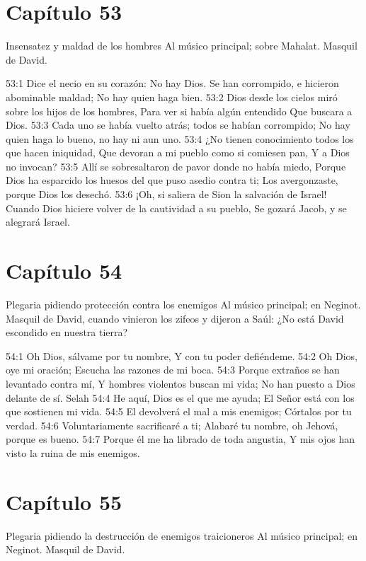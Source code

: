 \section*{Capítulo 53}
Insensatez y maldad de los hombres 
Al músico principal; sobre Mahalat. Masquil de David. 
 
53:1 Dice el necio en su corazón: No hay Dios. 
Se han corrompido, e hicieron abominable maldad; 
No hay quien haga bien. 
53:2 Dios desde los cielos miró sobre los hijos de los hombres, 
Para ver si había algún entendido 
Que buscara a Dios. 
53:3 Cada uno se había vuelto atrás; todos se habían corrompido; 
No hay quien haga lo bueno, no hay ni aun uno. 
53:4 ¿No tienen conocimiento todos los que hacen iniquidad, 
Que devoran a mi pueblo como si comiesen pan, 
Y a Dios no invocan? 
53:5 Allí se sobresaltaron de pavor donde no había miedo, 
Porque Dios ha esparcido los huesos del que puso asedio contra ti; 
Los avergonzaste, porque Dios los desechó. 
53:6 ¡Oh, si saliera de Sion la salvación de Israel! 
Cuando Dios hiciere volver de la cautividad a su pueblo, 
Se gozará Jacob, y se alegrará Israel. 
\section*{Capítulo 54}
Plegaria pidiendo protección contra los enemigos 
Al músico principal; en Neginot. Masquil de David, cuando vinieron los zifeos y dijeron a Saúl: ¿No está David escondido en nuestra tierra? 
 
54:1 Oh Dios, sálvame por tu nombre, 
Y con tu poder defiéndeme. 
54:2 Oh Dios, oye mi oración; 
Escucha las razones de mi boca. 
54:3 Porque extraños se han levantado contra mí, 
Y hombres violentos buscan mi vida; 
No han puesto a Dios delante de sí. Selah 
54:4 He aquí, Dios es el que me ayuda; 
El Señor está con los que sostienen mi vida. 
54:5 El devolverá el mal a mis enemigos; 
Córtalos por tu verdad. 
54:6 Voluntariamente sacrificaré a ti; 
Alabaré tu nombre, oh Jehová, porque es bueno. 
54:7 Porque él me ha librado de toda angustia, 
Y mis ojos han visto la ruina de mis enemigos. 
\section*{Capítulo 55}
Plegaria pidiendo la destrucción de enemigos traicioneros 
Al músico principal; en Neginot. Masquil de David. 
 
